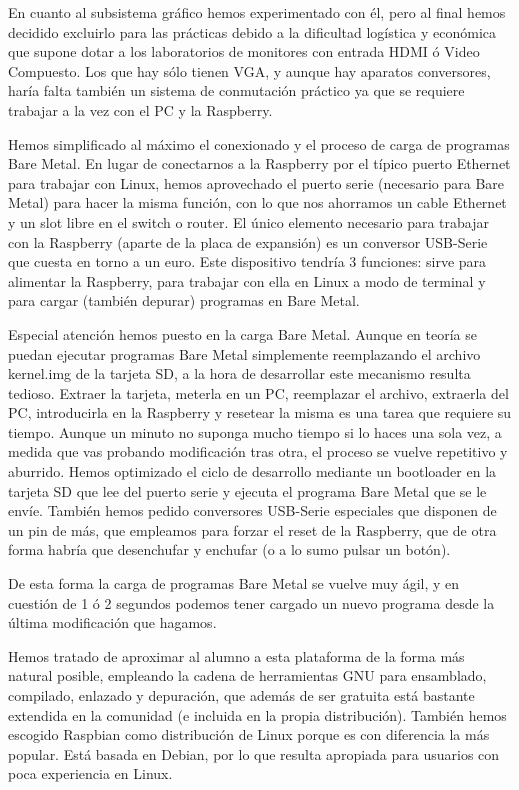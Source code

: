 En cuanto al subsistema gráfico hemos experimentado con él, pero al
final hemos decidido excluirlo para las prácticas debido a la
dificultad logística y económica que supone dotar a los laboratorios
de monitores con entrada HDMI ó Video Compuesto. Los que hay sólo
tienen VGA, y aunque hay aparatos conversores, haría falta también
un sistema de conmutación práctico ya que se requiere trabajar a la vez
con el PC y la Raspberry.

Hemos simplificado al máximo el conexionado y el proceso de carga de
programas Bare Metal. En lugar de conectarnos a la Raspberry por el
típico puerto Ethernet para trabajar con Linux, hemos aprovechado el
puerto serie (necesario para Bare Metal) para hacer la misma función,
con lo que nos ahorramos un cable Ethernet y un slot libre en el switch o
router. El único elemento necesario para trabajar con la Raspberry
(aparte de la placa de expansión) es un conversor USB-Serie que cuesta
en torno a un euro. Este dispositivo tendría 3 funciones: sirve para
alimentar la Raspberry, para trabajar con ella en Linux a modo de terminal
y para cargar (también depurar) programas en Bare Metal.

Especial atención hemos puesto en la carga Bare Metal. Aunque en teoría
se puedan ejecutar programas Bare Metal simplemente reemplazando el
archivo kernel.img de la tarjeta SD, a la hora de desarrollar este
mecanismo resulta tedioso. Extraer la tarjeta, meterla en un PC,
reemplazar el archivo, extraerla del PC, introducirla en la Raspberry
y resetear la misma es una tarea que requiere su tiempo. Aunque un minuto
no suponga mucho tiempo si lo haces una sola vez, a medida que vas
probando modificación tras otra, el proceso se vuelve repetitivo y
aburrido. Hemos optimizado el ciclo de desarrollo mediante un bootloader
en la tarjeta SD que lee del puerto serie y ejecuta el programa Bare
Metal que se le envíe. También hemos pedido conversores USB-Serie
especiales que disponen de un pin de más, que empleamos
para forzar el reset de la Raspberry, que de otra forma habría que
desenchufar y enchufar (o a lo sumo pulsar un botón).

De esta forma la carga de programas Bare Metal se vuelve muy ágil, y
en cuestión de 1 ó 2 segundos podemos tener cargado un nuevo programa
desde la última modificación que hagamos.

Hemos tratado de aproximar al alumno a esta plataforma de
la forma más natural posible, empleando la cadena de herramientas GNU
para ensamblado, compilado, enlazado y depuración, que además de ser
gratuita está bastante extendida en la comunidad (e incluida en la
propia distribución). También hemos escogido Raspbian como distribución
de Linux porque es con diferencia la más popular. Está basada en Debian,
por lo que resulta apropiada para usuarios con poca experiencia en Linux.

